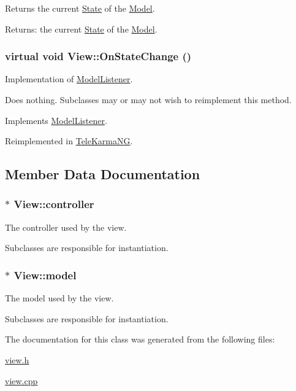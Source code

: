 Returns the current \hyperlink{classState}{State} of the \hyperlink{classModel}{Model}. 

\begin{Desc}
\item[Returns:]the current \hyperlink{classState}{State} of the \hyperlink{classModel}{Model}. \end{Desc}
\hypertarget{classView_92a0d9fd64b52e7f85d45c46c28a6546}{
\subsubsection[{OnStateChange}]{\setlength{\rightskip}{0pt plus 5cm}virtual void View::OnStateChange ()}}
\label{classView_92a0d9fd64b52e7f85d45c46c28a6546}


Implementation of \hyperlink{classModelListener}{ModelListener}. 

Does nothing. Subclasses may or may not wish to reimplement this method. 

Implements \hyperlink{classModelListener_63070a6f75480904846b7cfc6389aa4c}{ModelListener}.

Reimplemented in \hyperlink{classTeleKarmaNG_ce1e8d62f3e1d586e2aa5d2012c9a766}{TeleKarmaNG}.

\subsection{Member Data Documentation}
\hypertarget{classView_e097997e36de3c065f600e768e62c249}{
\subsubsection[{controller}]{$\ast$ {\bf View::controller}}}
\label{classView_e097997e36de3c065f600e768e62c249}


The controller used by the view. 

Subclasses are responsible for instantiation. \hypertarget{classView_f9f5eea17223c374879af02bd02dfdfb}{
\subsubsection[{model}]{$\ast$ {\bf View::model}}}
\label{classView_f9f5eea17223c374879af02bd02dfdfb}


The model used by the view. 

Subclasses are responsible for instantiation. 

The documentation for this class was generated from the following files:\begin{CompactItemize}
\item 
\hyperlink{view_8h}{view.h}\item 
\hyperlink{view_8cpp}{view.cpp}\end{CompactItemize}
